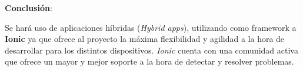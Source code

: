 \textbf{Conclusión}:

Se hará uso de aplicaciones híbridas (\textit{Hybrid apps}), utilizando como framework a \textbf{Ionic} ya que ofrece al proyecto la máxima flexibilidad y agilidad a la hora de desarrollar para los distintos dispositivos.
\textit{Ionic} cuenta con una comunidad activa que ofrece un mayor y mejor soporte a la hora de detectar y resolver problemas.












